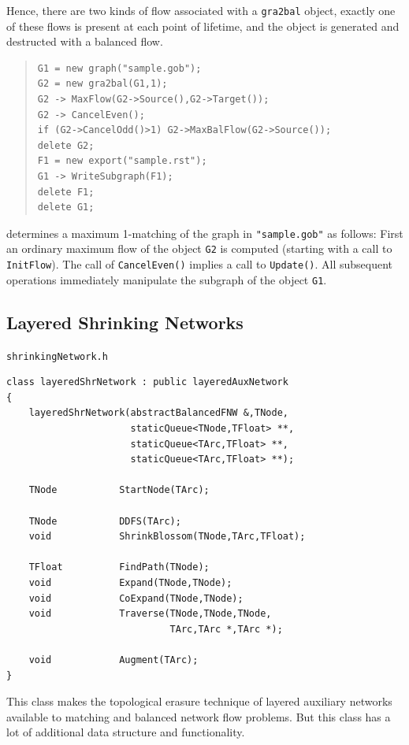 \documentclass[a4paper,11pt,twoside]{book}
\begin{document}
\begin{multicols}{2}
Hence, there are two kinds of flow associated with a \verb/gra2bal/ object,
exactly one of these flows is present at each point of lifetime, and the object
is generated and destructed with a balanced flow.
\sample
\begin{quote}
\begin{verbatim}
G1 = new graph("sample.gob");
G2 = new gra2bal(G1,1);
G2 -> MaxFlow(G2->Source(),G2->Target());
G2 -> CancelEven();
if (G2->CancelOdd()>1) G2->MaxBalFlow(G2->Source());
delete G2;
F1 = new export("sample.rst");
G1 -> WriteSubgraph(F1);
delete F1;
delete G1;
\end{verbatim}
\end{quote}
determines a maximum 1-matching of the graph in \verb/"sample.gob"/ as follows:
First an ordinary maximum flow of the object \verb/G2/ is computed
(starting with a call to \verb/InitFlow/). The call of \verb/CancelEven()/
implies a call to \verb/Update()/. All subsequent operations immediately
manipulate the subgraph of the object \verb/G1/.


\subsection{Layered Shrinking Networks}
\label{slb234}
\myinclude\verb/shrinkingNetwork.h/
\begin{mymethods}
\begin{verbatim}
class layeredShrNetwork : public layeredAuxNetwork
{
    layeredShrNetwork(abstractBalancedFNW &,TNode,
                      staticQueue<TNode,TFloat> **,
                      staticQueue<TArc,TFloat> **,
                      staticQueue<TArc,TFloat> **);

    TNode           StartNode(TArc);

    TNode           DDFS(TArc);
    void            ShrinkBlossom(TNode,TArc,TFloat);

    TFloat          FindPath(TNode);
    void            Expand(TNode,TNode);
    void            CoExpand(TNode,TNode);
    void            Traverse(TNode,TNode,TNode,
                             TArc,TArc *,TArc *);

    void            Augment(TArc);
}
\end{verbatim}
\end{mymethods}
This class makes the topological erasure technique of
layered auxiliary networks available to matching and balanced network flow
problems. But this class has a lot of additional data structure and
functionality.


\end{multicols}
\end{document}
